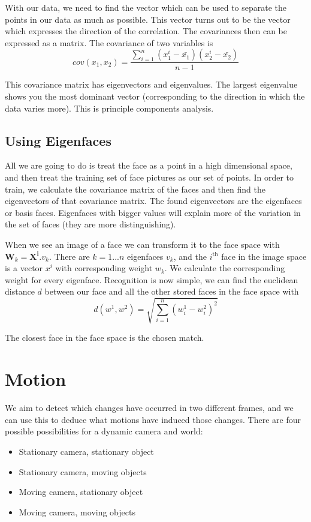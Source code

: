 \documentclass{article}
\begin{document}
	With our data, we need to find the vector which can be used to separate the points in our data as much as possible. This vector turns out to be the vector which expresses the direction of the correlation. The covariances then can be expressed as a matrix. The covariance of two variables is
	\[ cov(x_{1}, x_{2}) = \frac{\sum_{i=1}^{n}(x_{1}^{i} - \bar{x_{1}})(x_{2}^{i} - \bar{x_{2}})}{n - 1} \]	
	
	This covariance matrix has eigenvectors and eigenvalues. The largest eigenvalue shows you the most dominant vector (corresponding to the direction in which the data varies more). This is principle components analysis.
	
	\subsection{Using Eigenfaces}
	All we are going to do is treat the face as a point in a high dimensional space, and then treat the training set of face pictures as our set of points. In order to train, we calculate the covariance matrix of the faces and then find the eigenvectors of that covariance matrix. The found eigenvectors are the eigenfaces or basis faces. Eigenfaces with bigger values will explain more of the variation in the set of faces (they are more distinguishing).
	
	\par
	When we see an image of a face we can transform it to the face space with $\mathbf{W}_{k} = \mathbf{X}^{\mathbf{i}} . \mathit{v}_{k}$. There are $k=1...n$ eigenfaces $v_{k}$, and the $i^{\text{th}}$ face in the image space is a vector $x^{i}$ with corresponding weight $w_{k}$. We calculate the corresponding weight for every eigenface. Recognition is now simple, we can find the euclidean distance $d$ between our face and all the other stored faces in the face space with \[ d(w^{1}, w^{2}) = \sqrt{\sum_{i=1}^{n}(w_{i}^{1} - w_{i}^{2})^{2}} \]
	
	The closest face in the face space is the chosen match.
	\section{Motion}
	We aim to detect which changes have occurred in two different frames, and we can use this to deduce what motions have induced those changes. There are four possible possibilities for a dynamic camera and world:
	\begin{itemize}
		\item Stationary camera, stationary object
		\item Stationary camera, moving objects
		\item Moving camera, stationary object
		\item Moving camera, moving objects
	\end{itemize}
	
\end{document}
